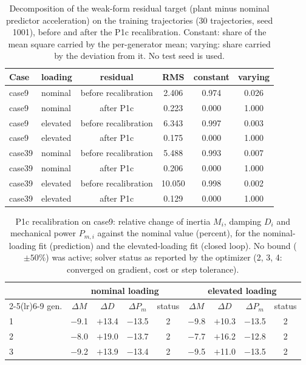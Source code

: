 \begin{table}[H]\centering\small
\caption{Decomposition of the weak-form residual target (plant minus nominal predictor acceleration) on the training trajectories (30 trajectories, seed 1001), before and after the P1c recalibration. Constant: share of the mean square carried by the per-generator mean; varying: share carried by the deviation from it. No test seed is used.}
\label{tab:S:decomp}
\begin{tabular}{llcccc}
\toprule
Case & loading & residual & RMS & constant & varying\\
\midrule
case9 & nominal & before recalibration & 2.406 & 0.974 & 0.026\\
case9 & nominal & after P1c & 0.223 & 0.000 & 1.000\\
case9 & elevated & before recalibration & 6.343 & 0.997 & 0.003\\
case9 & elevated & after P1c & 0.175 & 0.000 & 1.000\\
case39 & nominal & before recalibration & 5.488 & 0.993 & 0.007\\
case39 & nominal & after P1c & 0.206 & 0.000 & 1.000\\
case39 & elevated & before recalibration & 10.050 & 0.998 & 0.002\\
case39 & elevated & after P1c & 0.129 & 0.000 & 1.000\\
\bottomrule
\end{tabular}
\end{table}

\begin{table}[H]\centering\small
\caption{P1c recalibration on case9: relative change of inertia $M_i$, damping $D_i$ and mechanical power $P_{m,i}$ against the nominal value (percent), for the nominal-loading fit (prediction) and the elevated-loading fit (closed loop). No bound ($\pm50\%$) was active; solver status as reported by the optimizer (2, 3, 4: converged on gradient, cost or step tolerance).}
\label{tab:S:p1c_case9}
\begin{tabular}{lcccccccc}
\toprule
 & \multicolumn{4}{c}{nominal loading} & \multicolumn{4}{c}{elevated loading}\\
\cmidrule(lr){2-5}\cmidrule(lr){6-9}
gen. & $\Delta M$ & $\Delta D$ & $\Delta P_m$ & status & $\Delta M$ & $\Delta D$ & $\Delta P_m$ & status\\
\midrule
1 & $-$9.1 & $+$13.4 & $-$13.5 & 2 & $-$9.8 & $+$10.3 & $-$13.5 & 2\\
2 & $-$8.0 & $+$19.0 & $-$13.7 & 2 & $-$7.7 & $+$16.2 & $-$12.8 & 2\\
3 & $-$9.2 & $+$13.9 & $-$13.4 & 2 & $-$9.5 & $+$11.0 & $-$13.5 & 2\\
\bottomrule
\end{tabular}
\end{table}

